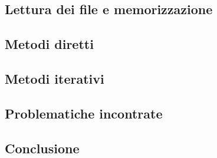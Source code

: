 \documentclass[11pt,a4paper]{scrartcl}
\begin{document}
\subsection*{Lettura dei file e memorizzazione}

\subsection*{Metodi diretti}

\subsection*{Metodi iterativi}

\subsection*{Problematiche incontrate}

\subsection*{Conclusione}
\end{document}
